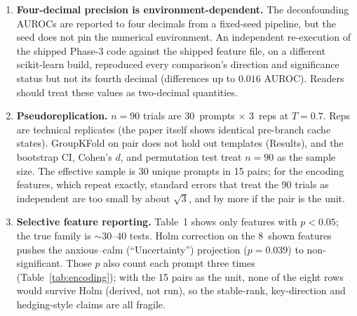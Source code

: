 \documentclass[11pt,a4paper]{article}
\begin{document}
\begin{enumerate}[nosep]
          different-complexity), indicating partial confounding by
          question structure. The question wording alone separates these sets better than the cache features do. The run's
          other three comparisons are now reported in
          Table~\ref{tab:deconfound}; the entity-recognition positive
          control is the strongest cell in the run, though prompt length alone separates it at $0.944$, and one of its 30
          entity groups is a no-op (Section~\ref{sec:encoding}).
    \item \textbf{Four-decimal precision is environment-dependent.} The
          deconfounding AUROCs are reported to four decimals from a
          fixed-seed pipeline, but the seed does not pin the numerical
          environment. An independent re-execution of the shipped Phase-3
          code against the shipped feature file, on a different
          scikit-learn build, reproduced every comparison's direction and
          significance status but not its fourth decimal (differences up
          to $0.016$ AUROC). Readers should treat these values as
          two-decimal quantities.
    \item \textbf{Pseudoreplication.} $n{=}90$ trials are
          30~prompts $\times$ 3~reps at $T{=}0.7$. Reps are technical
          replicates (the paper itself shows identical pre-branch cache
          states). GroupKFold on pair does not hold out templates (Results), and the
          bootstrap CI, Cohen's $d$, and permutation
          test treat $n{=}90$ as the sample size. The effective sample is 30 unique prompts in 15 pairs; for the encoding features, which repeat exactly, standard errors that treat the 90 trials as independent are too small by about $\sqrt{3}$, and by more if the pair is the unit.
    \item \textbf{Selective feature reporting.} Table~1 shows only
          features with $p{<}0.05$; the true family is ${\sim}30$--$40$
          tests. Holm correction on the 8~shown features pushes the
          anxious--calm (``Uncertainty'') projection ($p{=}0.039$) to non-significant.
          Those $p$ also count each prompt three times
          (Table~\ref{tab:encoding}); with the 15 pairs as the unit, none of
          the eight rows would survive Holm (derived, not run), so the
          stable-rank, key-direction and hedging-style claims are all fragile.
\end{enumerate}
\end{document}
